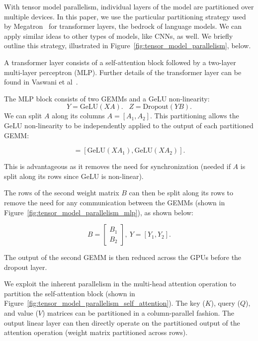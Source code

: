 With tensor model parallelism, individual layers of the model are partitioned over multiple devices. In this paper, we use the particular partitioning strategy used by Megatron~\cite{shoeybi2019megatron} for transformer layers, the bedrock of language models. We can apply similar ideas to other types of models, like CNNs, as well. We briefly outline this strategy, illustrated in Figure~\ref{fig:tensor_model_parallelism}, below.

A transformer layer consists of a self-attention block followed by a two-layer multi-layer perceptron (MLP). Further details of the transformer layer can be found in Vaswani et al~\cite{vaswani2017attention}. 

The MLP block consists of two GEMMs and a GeLU non-linearity: $$Y = \textrm{GeLU}(XA). \, \, \, \, \, Z = \textrm{Dropout}(YB).$$
We can split $A$ along its columns $A=[A_1, A_2]$. This partitioning allows the GeLU non-linearity to be independently applied to the output of each partitioned GEMM:

\begin{equation}
    [Y_1, Y_2]= [\textrm{GeLU}(XA_1), \textrm{GeLU}(XA_2)].  \nonumber
 \end{equation}

 This is advantageous as it removes the need for synchronization (needed if $A$ is split along its rows since GeLU is non-linear).

 The rows of the second weight matrix $B$ can then be split along its rows to remove the need for any communication between the GEMMs (shown in Figure~\ref{fig:tensor_model_parallelism_mlp}), as shown below:

\begin{equation}
    B=\begin{bmatrix}
        B_1 \\
        B_2
    \end{bmatrix}, \
     Y = [Y_1, Y_2]. \nonumber
 \end{equation}

 The output of the second GEMM is then reduced across the GPUs before the dropout layer.

We exploit the inherent parallelism in the multi-head attention operation to partition the self-attention block (shown in Figure~\ref{fig:tensor_model_parallelism_self_attention}). The key ($K$), query ($Q$), and value ($V$) matrices can be partitioned in a column-parallel fashion. The output linear layer can then directly operate on the partitioned output of the attention operation (weight matrix partitioned across rows).

